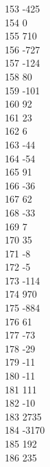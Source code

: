 { 153	-425 \\
 154	0 \\
 155	710 \\
 156	-727 \\
 157	-124 \\
 158	80 \\
 159	-101 \\
 160	92 \\
 161	23 \\
 162	6 \\
 163	-44 \\
 164	-54 \\
 165	91 \\
 166	-36 \\
 167	62 \\
 168	-33 \\
 169	7 \\
 170	35 \\
 171	-8 \\
 172	-5 \\
 173	-114 \\
 174	970 \\
 175	-884 \\
 176	61 \\
 177	-73 \\
 178	-29 \\
 179	-11 \\
 180	-11 \\
 181	111 \\
 182	-10 \\
 183	2735 \\
 184	-3170 \\
 185	192 \\
 186	235 \\
}
